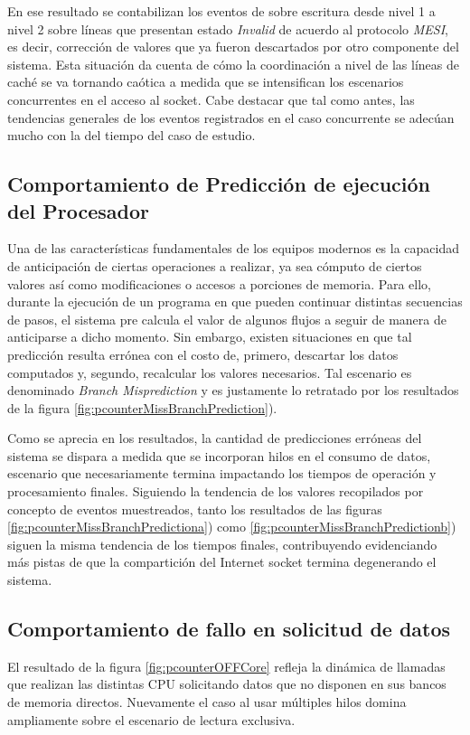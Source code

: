 En ese resultado se contabilizan los eventos de sobre escritura desde nivel 1 a nivel 2 sobre líneas que presentan estado \emph{Invalid} de acuerdo al protocolo \emph{MESI}, es decir, corrección de valores que ya fueron descartados por otro componente del sistema. Esta situación da cuenta de cómo la coordinación a nivel de las líneas de caché se va tornando caótica a medida que se intensifican los escenarios concurrentes en el acceso al socket. Cabe destacar que tal como antes, las tendencias generales de los eventos registrados en el caso concurrente se adecúan mucho con la del tiempo del caso de estudio.

\subsection{Comportamiento de Predicción de ejecución del Procesador}
Una de las características fundamentales de los equipos modernos es la capacidad de anticipación de ciertas operaciones a realizar, ya sea cómputo de ciertos valores así como modificaciones o accesos a porciones de memoria. Para ello, durante la ejecución de un programa en que pueden continuar distintas secuencias de pasos, el sistema pre calcula el valor de algunos flujos a seguir de manera de anticiparse a dicho momento. Sin embargo, existen situaciones en que tal predicción resulta errónea con el costo de, primero, descartar los datos computados y, segundo, recalcular los valores necesarios. Tal escenario es denominado \emph{Branch Misprediction} y es justamente lo retratado por los resultados de la figura \ref{fig:pcounterMissBranchPrediction}).

Como se aprecia en los resultados, la cantidad de predicciones erróneas del sistema se dispara a medida que se incorporan hilos en el consumo de datos, escenario que necesariamente termina impactando los tiempos de operación y procesamiento finales. Siguiendo la tendencia de los valores recopilados por concepto de eventos muestreados, tanto los resultados de las figuras \ref{fig:pcounterMissBranchPredictiona}) como \ref{fig:pcounterMissBranchPredictionb}) siguen la misma tendencia de los tiempos finales, contribuyendo evidenciando más pistas de que la compartición del Internet socket termina degenerando el sistema.

\subsection{Comportamiento de fallo en solicitud de datos}
El resultado de la figura \ref{fig:pcounterOFFCore} refleja la dinámica de llamadas que realizan las distintas CPU solicitando datos que no disponen en sus bancos de memoria directos. Nuevamente el caso al usar múltiples hilos domina ampliamente sobre el escenario de lectura exclusiva.

